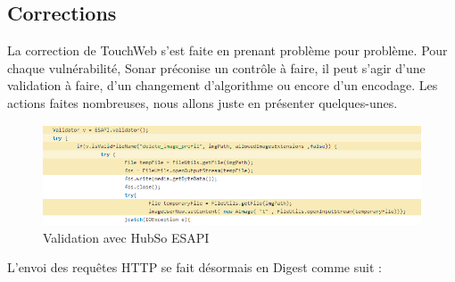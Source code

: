 \subsection{Corrections}
La correction de TouchWeb s'est faite en prenant problème pour problème. Pour chaque vulnérabilité, Sonar préconise un contrôle à faire, il peut s'agir d'une validation à faire, d'un changement d'algorithme ou encore d'un encodage. Les actions faites nombreuses, nous allons juste en présenter quelques-unes.
\begin{figure}[H]
	\centering
	\begin{minipage}{12cm}
		\centering
		\includegraphics[width=1\textwidth]{fig/esapi-validation.PNG}
	\end{minipage}
	\caption{Validation avec HubSo ESAPI }
	\label{fig:sdfgdsds}
\end{figure}
L'envoi des requêtes HTTP se fait désormais en Digest comme suit :
\lstset{language=Java}
